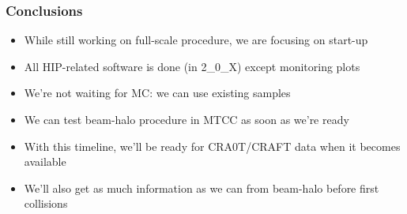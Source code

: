 \documentclass[compress]{beamer}
\begin{document}
\begin{frame}
\frametitle{Conclusions}
\begin{itemize}\setlength{\itemsep}{0.4 cm}
\item While still working on full-scale procedure, we are focusing on
start-up
\item All HIP-related software is done (in 2\_0\_X) except monitoring plots
\item We're not waiting for MC: we can use existing samples
\item We can test beam-halo procedure in MTCC as soon as we're ready
\item With this timeline, we'll be ready for CRA0T/CRAFT data when
it becomes available
\item We'll also get as much information as we can from beam-halo
before first collisions
\end{itemize}
\label{numpages}
\end{frame}
\end{document}
